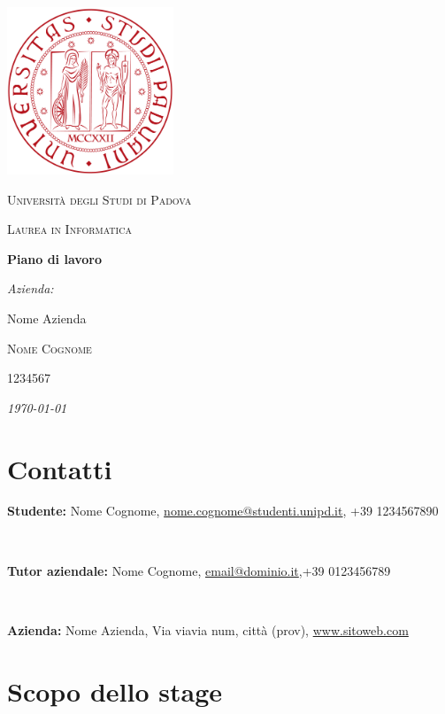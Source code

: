 \documentclass[a4paper]{article}
\makeatletter
\newcommand{\nomeStudente}{Nome}
\newcommand{\cognomeStudente}{Cognome}
\newcommand{\matricolaStudente}{1234567}
\newcommand{\emailStudente}{nome.cognome@studenti.unipd.it}
\newcommand{\telStudente}{+39 1234567890}
\newcommand{\nomeTutorAziendale}{Nome}
\newcommand{\cognomeTutorAziendale}{Cognome}
\newcommand{\emailTutorAziendale}{email@dominio.it}
\newcommand{\telTutorAziendale}{+39 0123456789}
\newcommand{\ragioneSocAzienda}{Nome Azienda}
\newcommand{\indirizzoAzienda}{Via viavia num, città (prov)}
\newcommand{\sitoAzienda}{www.sitoweb.com}
\makeatother
\begin{document}
\begin{titlepage}
	\centering
	\includegraphics[height=5cm]{./immagini/logo-unipd.png} \par \vspace{1cm}
	{\scshape\LARGE Università degli Studi di Padova \par}
	\vspace{0.5cm}
	{\scshape\Large Laurea in Informatica \par}
	\vspace{1cm}
	{\Huge\bfseries Piano di lavoro \par}
	\vspace{0.5cm}
	{\Large\itshape Azienda:\par \ragioneSocAzienda{} \par}
	\vfill
	{\scshape\Large \nomeStudente{} \cognomeStudente{}\par}
	{\scshape\large \matricolaStudente \par}
	\vfill
	{\itshape \today}
	
\end{titlepage}

\section*{Contatti}
\parbox{14.7cm}{\textbf{Studente:} \nomeStudente{} \cognomeStudente{}, \href{mailto:\emailStudente{}}{\emailStudente{}}, \telStudente{}} \\

\noindent
\parbox{14.7cm}{\textbf{Tutor aziendale:} \nomeTutorAziendale{} \cognomeTutorAziendale{}, \href{mailto:\emailTutorAziendale{}}{\emailTutorAziendale{}},\linebreak \telTutorAziendale{}} \\

\noindent
\parbox{14.7cm}{\textbf{Azienda:} \ragioneSocAzienda{}, \indirizzoAzienda{}, \href{\sitoAzienda{}}{\sitoAzienda{}}}

\section*{Scopo dello stage}
\end{document}
